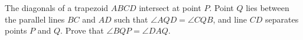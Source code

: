 The diagonals of a trapezoid $ABCD$ intersect at point $P$. Point $Q$ lies between the parallel lines $BC$ and $AD$ such that $\angle AQD = \angle CQB$, and line $CD$ separates points $P$ and $Q$. Prove that $\angle BQP = \angle DAQ$.
